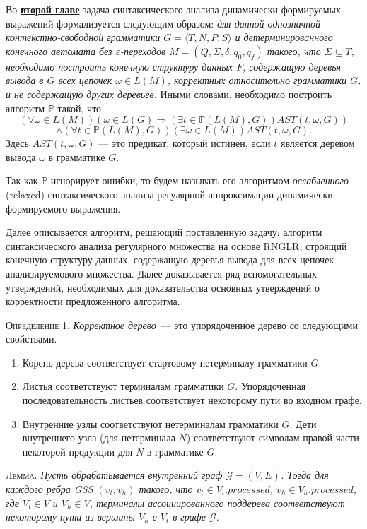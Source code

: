 Во \underline{\textbf{второй главе}} задача синтаксического анализа динамически формируемых выражений формализуется следующим образом: \textit{ для данной однозначной контекстно-свободной грамматики $G = \langle T, N, P, S \rangle$ и детерминированного конечного автомата без $\varepsilon$-переходов $M=(Q,\Sigma,\delta,q_0,q_f)$ такого, что $\Sigma \subseteq T$, необходимо построить конечную структуру данных $F$, содержащую деревья вывода в $G$ всех цепочек $\omega \in L(M)$, корректных относительно грамматики $G$, и не содержащую других деревьев. } Иными словами, необходимо построить алгоритм $\mathbb{P}$ такой, что
    $$(\forall \omega \in L(M)) (\omega \in L(G) \Rightarrow (\exists t \in \mathbb{P}(L(M),G))AST(t, \omega, G))$$
    $$\land (\forall t \in \mathbb{P}(L(M),G))(\exists \omega \in L(M))AST(t,\omega,G).$$ 
    Здесь $AST(t,\omega,G)$ --- это предикат, который истинен, если $t$ является деревом вывода $\omega$ в грамматике $G$.


Так как $\mathbb{P}$ игнорирует ошибки, то будем называть его алгоритмом \textit{ослабленного} (relaxed) синтаксического анализа регулярной аппроксимации динамически формируемого выражения.

Далее описывается алгоритм, решающий поставленную задачу: алгоритм синтаксического анализа регулярного множества на основе RNGLR, строящий конечную структуру данных, содержащую деревья вывода для 
всех цепочек анализируемового множества. Далее доказывается ряд вспомогательных утверждений, необходимых для доказательства основных утверждений о корректности предложенного алгоритма.

\textsc{Определение 1.} 
\emph{Корректное дерево}~--- это упорядоченное дерево со следующими свойствами.
\begin{enumerate}
  \item Корень дерева соответствует стартовому нетерминалу грамматики $G$.
  \item Листья соответствуют терминалам грамматики $G$. Упорядоченная последовательность листьев соответствует некоторому пути во входном графе.
  \item Внутренние узлы соответствуют нетерминалам грамматики $G$. Дети внутреннего узла (для нетерминала $N$) соответствуют символам правой части некоторой продукции для $N$ в грамматике $G$.
\end{enumerate}

\textsc{Лемма.}
\textit{Пусть обрабатывается внутренний граф $\mathcal{G}=(V,E)$. Тогда для каждого ребра GSS $(v_{t}, v_{h})$ такого, что $v_{t} \in V_{t}.processed$, $v_{h} \in V_{h}.processed$, где $V_{t} \in V$ и $V_{h} \in V$, терминалы ассоциированного поддерева соответствуют некоторому пути из вершины $V_{h}$ в $V_{t}$ в графе $\mathcal{G}$.}

